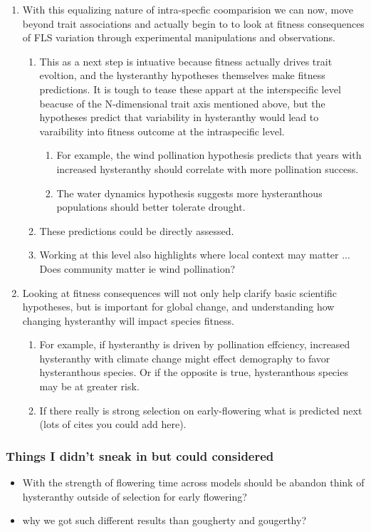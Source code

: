 \documentclass[12pt]{article}\usepackage[]{graphicx}\usepackage[]{color}
\begin{document}
\begin{enumerate}
\item  With this equalizing nature of intra-specfic coomparision we can now, move beyond trait associations and actually begin to to look at fitness consequences of FLS variation through experimental manipulations and observations.
\begin{enumerate}
\item This as a next step is intuative because fitness actually drives trait evoltion, and the hysteranthy hypotheses themselves make fitness predictions. It is tough to tease these appart at the interspecific level beacuse of the N-dimensional trait axis mentioned above, but the hypotheses predict that variability in hysteranthy would lead to varaibility into fitness outcome at the intraspecific level.
\begin{enumerate}
\item For example, the wind pollination hypothesis predicts that years with increased hysteranthy should correlate with more pollination success.
\item The water dynamics hypothesis suggests more hysteranthous populations should better tolerate drought. 
\end{enumerate}
\item These predictions could be directly assessed.
\item Working at this level also highlights where local context may matter ... Does community matter ie wind pollination?
\end{enumerate}
\item Looking at fitness consequences will not only help clarify basic scientific hypotheses, but is important for global change, and understanding how changing hysteranthy will impact species fitness.
\begin{enumerate}
\item For example, if hysteranthy is driven by pollination effciency, increased hysteranthy with climate change might effect demography to favor hysteranthous species. Or if the opposite is true, hysteranthous species may be at greater risk.
\item If there really is strong selection on early-flowering what is predicted next (lots of cites you could add here). %
\end{enumerate}

\end{enumerate}


\subsubsection{Things I didn't sneak in but could considered}
    \begin{itemize}
        \item With the strength of flowering time across models should be abandon think of hysteranthy outside of selection for early flowering?
       
    \item why we got such different results than gougherty and gougerthy?
   
 \end{itemize}

\end{document}
